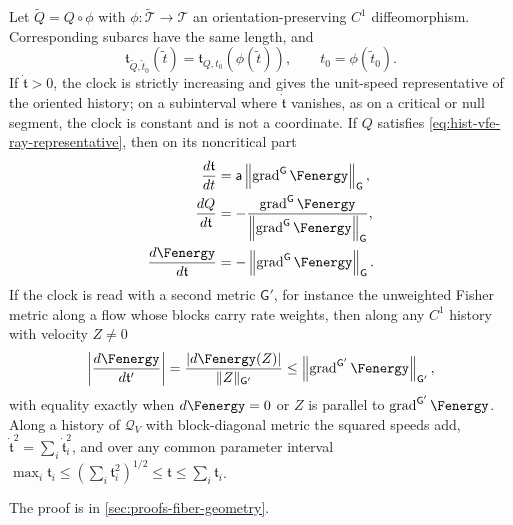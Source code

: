 Let $\widetilde Q=Q\circ\phi$ with $\phi:\widetilde{\mathcal T}\to\mathcal T$ an
orientation-preserving $C^1$ diffeomorphism.  Corresponding subarcs have the same length,
and
\begin{equation}
\mathfrak t_{\widetilde Q,\widetilde t_0}(\widetilde t)
=\mathfrak t_{Q,t_0}(\phi(\widetilde t)),
\qquad
t_0=\phi(\widetilde t_0).
\label{eq:hist-clock-reparameterization-law}
\end{equation}
If $\dot{\mathfrak t}>0$, the clock is strictly increasing and gives the unit-speed
representative of the oriented history; on a subinterval where $\dot{\mathfrak t}$
vanishes, as on a critical or null segment, the clock is constant and is not a
coordinate.  If $Q$ satisfies \eqref{eq:hist-vfe-ray-representative}, then on its
noncritical part
\begin{align}
\frac{d\mathfrak t}{dt}
&=\mathsf a\left\|\operatorname{grad}^{\mathsf G}\Fenergy\right\|_{\mathsf G},
\label{eq:hist-vfe-clock-rate}\\
\frac{dQ}{d\mathfrak t}
&=-\frac{\operatorname{grad}^{\mathsf G}\Fenergy}
{\left\|\operatorname{grad}^{\mathsf G}\Fenergy\right\|_{\mathsf G}},
\label{eq:hist-vfe-unit-tangent}\\
\frac{d\Fenergy}{d\mathfrak t}
&=-\left\|\operatorname{grad}^{\mathsf G}\Fenergy\right\|_{\mathsf G}.
\label{eq:hist-vfe-dissipation-per-length}
\end{align}
If the clock is read with a second metric $\mathsf G'$, for instance the unweighted
Fisher metric along a flow whose blocks carry rate weights, then along any $C^1$ history
with velocity $Z\ne0$
\begin{equation}
\left|\frac{d\Fenergy}{d\mathfrak t'}\right|
=\frac{|d\Fenergy(Z)|}{\lVert Z\rVert_{\mathsf G'}}
\leq\left\|\operatorname{grad}^{\mathsf G'}\Fenergy\right\|_{\mathsf G'},
\label{eq:hist-clock-metric-dissipation-bound}
\end{equation}
with equality exactly when $d\Fenergy=0$ or $Z$ is parallel to
$\operatorname{grad}^{\mathsf G'}\Fenergy$.
Along a history of $\mathcal Q_V$ with block-diagonal metric the squared speeds add,
$\dot{\mathfrak t}^2=\sum_i\dot{\mathfrak t}_i^2$, and over any common parameter interval
$\max_i\mathfrak t_i\leq(\sum_i\mathfrak t_i^2)^{1/2}\leq\mathfrak t\leq\sum_i\mathfrak
t_i$.  

The proof is in \cref{sec:proofs-fiber-geometry}.

